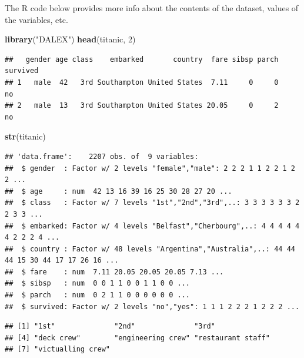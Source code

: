 \documentclass[12pt,]{krantz}
\newenvironment{Shaded}{\begin{snugshade}}{\end{snugshade}}
\newcommand{\DecValTok}[1]{\textcolor[rgb]{0.00,0.00,0.81}{#1}}
\newcommand{\KeywordTok}[1]{\textcolor[rgb]{0.13,0.29,0.53}{\textbf{#1}}}
\newcommand{\NormalTok}[1]{#1}
\newcommand{\OperatorTok}[1]{\textcolor[rgb]{0.81,0.36,0.00}{\textbf{#1}}}
\newcommand{\StringTok}[1]{\textcolor[rgb]{0.31,0.60,0.02}{#1}}
\begin{document}
The R code below provides more info about the contents of the dataset, values of the variables, etc.

\begin{Shaded}
\begin{Highlighting}[]
\KeywordTok{library}\NormalTok{(}\StringTok{"DALEX"}\NormalTok{)}
\KeywordTok{head}\NormalTok{(titanic, }\DecValTok{2}\NormalTok{)}
\end{Highlighting}
\end{Shaded}

\begin{verbatim}
##   gender age class    embarked       country  fare sibsp parch survived
## 1   male  42   3rd Southampton United States  7.11     0     0       no
## 2   male  13   3rd Southampton United States 20.05     0     2       no
\end{verbatim}

\begin{Shaded}
\begin{Highlighting}[]
\KeywordTok{str}\NormalTok{(titanic)}
\end{Highlighting}
\end{Shaded}

\begin{verbatim}
## 'data.frame':    2207 obs. of  9 variables:
##  $ gender  : Factor w/ 2 levels "female","male": 2 2 2 1 1 2 2 1 2 2 ...
##  $ age     : num  42 13 16 39 16 25 30 28 27 20 ...
##  $ class   : Factor w/ 7 levels "1st","2nd","3rd",..: 3 3 3 3 3 3 2 2 3 3 ...
##  $ embarked: Factor w/ 4 levels "Belfast","Cherbourg",..: 4 4 4 4 4 4 2 2 2 4 ...
##  $ country : Factor w/ 48 levels "Argentina","Australia",..: 44 44 44 15 30 44 17 17 26 16 ...
##  $ fare    : num  7.11 20.05 20.05 20.05 7.13 ...
##  $ sibsp   : num  0 0 1 1 0 0 1 1 0 0 ...
##  $ parch   : num  0 2 1 1 0 0 0 0 0 0 ...
##  $ survived: Factor w/ 2 levels "no","yes": 1 1 1 2 2 2 1 2 2 2 ...
\end{verbatim}

\begin{Shaded}
\end{Shaded}

\begin{verbatim}
## [1] "1st"              "2nd"              "3rd"             
## [4] "deck crew"        "engineering crew" "restaurant staff"
## [7] "victualling crew"
\end{verbatim}
\end{document}
